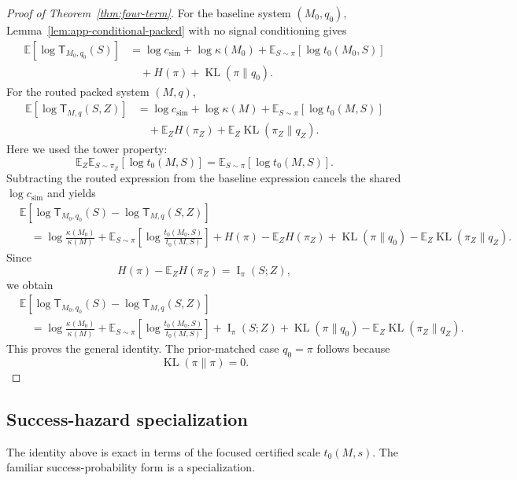 \documentclass{article}
\DeclareMathOperator{\KL}{KL}
\DeclareMathOperator{\MI}{I}
\newcommand{\E}{\mathbb{E}}
\begin{document}
\begin{proof}[Proof of Theorem~\ref{thm:four-term}]
For the baseline system \((M_0,q_0)\), Lemma~\ref{lem:app-conditional-packed} with no
signal conditioning gives
\[
\begin{aligned}
    \E[\log \mathsf T_{M_0,q_0}(S)]
    &=
    \log c_{\mathrm{sim}}
    +
    \log\kappa(M_0)
    +
    \E_{S\sim\pi}[\log t_0(M_0,S)]
    \\
    &\quad
    +
    H(\pi)
    +
    \KL(\pi\|q_0).
\end{aligned}
\]
For the routed packed system \((M,q)\),
\[
\begin{aligned}
    \E[\log \mathsf T_{M,q}(S,Z)]
    &=
    \log c_{\mathrm{sim}}
    +
    \log\kappa(M)
    +
    \E_{S\sim\pi}[\log t_0(M,S)]
    \\
    &\quad
    +
    \E_ZH(\pi_Z)
    +
    \E_Z\KL(\pi_Z\|q_Z).
\end{aligned}
\]
Here we used the tower property:
\[
    \E_Z\E_{S\sim\pi_Z}[\log t_0(M,S)]
    =
    \E_{S\sim\pi}[\log t_0(M,S)].
\]
Subtracting the routed expression from the baseline expression cancels the shared
\(\log c_{\mathrm{sim}}\) and yields
\[
\begin{aligned}
&\E[
    \log \mathsf T_{M_0,q_0}(S)
    -
    \log \mathsf T_{M,q}(S,Z)
]
\\
&\quad =
\log\frac{\kappa(M_0)}{\kappa(M)}
+
\E_{S\sim\pi}
\left[
    \log\frac{t_0(M_0,S)}{t_0(M,S)}
\right]
+
H(\pi)-\E_ZH(\pi_Z)
+
\KL(\pi\|q_0)
-
\E_Z\KL(\pi_Z\|q_Z).
\end{aligned}
\]
Since
\[
    H(\pi)-\E_ZH(\pi_Z)=\MI_\pi(S;Z),
\]
we obtain
\[
\begin{aligned}
&\E[
    \log \mathsf T_{M_0,q_0}(S)
    -
    \log \mathsf T_{M,q}(S,Z)
]
\\
&\quad =
\log\frac{\kappa(M_0)}{\kappa(M)}
+
\E_{S\sim\pi}
\left[
    \log\frac{t_0(M_0,S)}{t_0(M,S)}
\right]
+
\MI_\pi(S;Z)
+
\KL(\pi\|q_0)
-
\E_Z\KL(\pi_Z\|q_Z).
\end{aligned}
\]
This proves the general identity.  The prior-matched case \(q_0=\pi\) follows because
\[
    \KL(\pi\|\pi)=0.
\]
\end{proof}

\subsection{Success-hazard specialization}

The identity above is exact in terms of the focused certified scale \(t_0(M,s)\).
The familiar success-probability form is a specialization.
\end{document}
